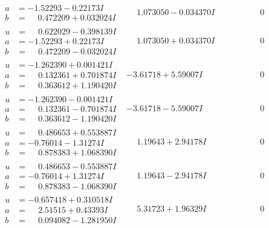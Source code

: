 \documentclass[1p]{elsarticle_modified}
\theoremstyle{definition}
\begin{document}
$$\begin{array}{c|c|c}
\begin{aligned}
a &= -1.52293 - 0.22173 I \\
b &= \phantom{-}0.472209 + 0.032024 I\end{aligned}
 & \phantom{-}1.073050 - 0.034370 I & \phantom{-0.000000 } 0 \\ \hline\begin{aligned}
u &= \phantom{-}0.622029 - 0.398139 I \\
a &= -1.52293 + 0.22173 I \\
b &= \phantom{-}0.472209 - 0.032024 I\end{aligned}
 & \phantom{-}1.073050 + 0.034370 I & \phantom{-0.000000 } 0 \\ \hline\begin{aligned}
u &= -1.262390 + 0.001421 I \\
a &= \phantom{-}0.132361 + 0.701874 I \\
b &= \phantom{-}0.363612 + 1.190420 I\end{aligned}
 & -3.61718 + 5.59007 I & \phantom{-0.000000 } 0 \\ \hline\begin{aligned}
u &= -1.262390 - 0.001421 I \\
a &= \phantom{-}0.132361 - 0.701874 I \\
b &= \phantom{-}0.363612 - 1.190420 I\end{aligned}
 & -3.61718 - 5.59007 I & \phantom{-0.000000 } 0 \\ \hline\begin{aligned}
u &= \phantom{-}0.486653 + 0.553887 I \\
a &= -0.76014 - 1.31274 I \\
b &= \phantom{-}0.878383 + 1.068390 I\end{aligned}
 & \phantom{-}1.19643 + 2.94178 I & \phantom{-0.000000 } 0 \\ \hline\begin{aligned}
u &= \phantom{-}0.486653 - 0.553887 I \\
a &= -0.76014 + 1.31274 I \\
b &= \phantom{-}0.878383 - 1.068390 I\end{aligned}
 & \phantom{-}1.19643 - 2.94178 I & \phantom{-0.000000 } 0 \\ \hline\begin{aligned}
u &= -0.657418 + 0.310518 I \\
a &= \phantom{-}2.51515 + 0.43393 I \\
b &= \phantom{-}0.094082 - 1.281950 I\end{aligned}
 & \phantom{-}5.31723 + 1.96329 I & \phantom{-0.000000 } 0 \\ \hline\begin{aligned}

\end{aligned}
\end{array}$$
\end{document}
